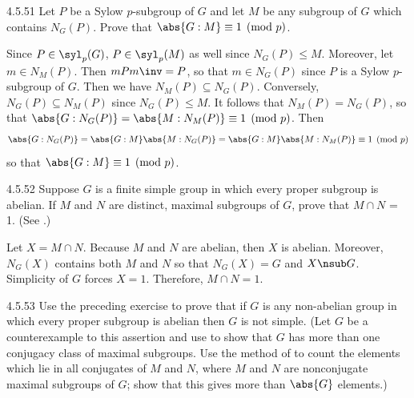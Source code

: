 \begin{exercise}{4.5.51}
	Let $P$ be a Sylow $p$-subgroup of $G$ and let $M$ be any subgroup of $G$ which contains $N_G(P)$.
	Prove that $\abs{G : M} \equiv 1 \pmod p$.
\end{exercise}

\begin{sol}
	Since $P \in \syl_p(G)$, $P \in \syl_p(M)$ as well since $N_G(P) \leq M$.
	Moreover, let $m \in N_M(P)$.
	Then $mPm\inv = P$, so that $m \in N_G(P)$ since $P$ is a Sylow $p$-subgroup of $G$.
	Then we have $N_M(P) \subseteq N_G(P)$.
	Conversely, $N_G(P) \subseteq N_M(P)$ since $N_G(P) \leq M$.
	It follows that $N_M(P) = N_G(P)$, so that $\abs{G : N_G(P)} = \abs{M : N_M(P)} \equiv 1 \pmod p$.
	Then
	\[
		\abs{G : N_G(P)} = \abs{G : M}\abs{M : N_G(P)} = \abs{G : M}\abs{M : N_M(P)} \equiv 1 \pmod p
	\]
	so that $\abs{G : M} \equiv 1 \pmod p$.
\end{sol}

\begin{exercise}{4.5.52}
	Suppose $G$ is a finite simple group in which every proper subgroup is abelian.
	If $M$ and $N$ are distinct, maximal subgroups of $G$, prove that $M \cap N$ = 1. (See .)
\end{exercise}

\begin{sol}
	Let $X = M \cap N$.
	Because $M$ and $N$ are abelian, then $X$ is abelian.
	Moreover, $N_G(X)$ contains both $M$ and $N$ so that $N_G(X) = G$ and $X \nsub G$.
	Simplicity of $G$ forces $X = 1$.
	Therefore, $M \cap N = 1$.
\end{sol}

\begin{exercise}{4.5.53}
	Use the preceding exercise to prove that if $G$ is any non-abelian group in which every proper subgroup is abelian then $G$ is not simple. (Let $G$ be a counterexample to this assertion and use  to show that $G$ has more than one conjugacy class of maximal subgroups.
	Use the method of  to count the elements which lie in all conjugates of $M$ and $N$, where $M$ and $N$ are nonconjugate maximal subgroups of $G$; show that this gives more than $\abs{G}$ elements.)
\end{exercise}

